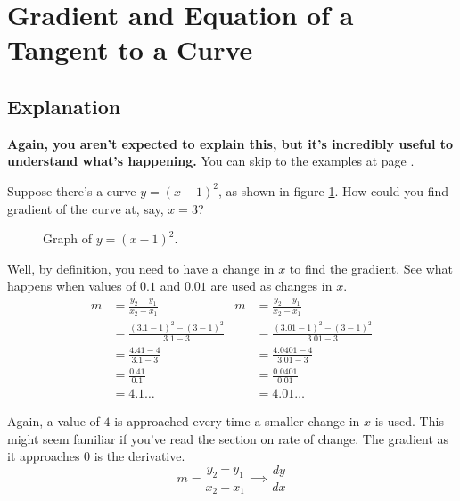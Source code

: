 \section{Gradient and Equation of a Tangent to a Curve}
\subsection{Explanation}
\textbf{Again, you aren't expected to explain this, but it's incredibly useful to understand what's happening.} You can skip to the examples at page \pageref{sec:derivativeExamples}.

Suppose there's a curve $y=(x-1)^2$, as shown in figure \ref{fig:gradientBasicExample}. How could you find gradient of the curve at, say, $x=3$?

\begin{figure}[h!]
	\centering
	\caption{Graph of $y=(x-1)^2$.}
	\label{fig:gradientBasicExample}
\end{figure}

Well, by definition, you need to have a change in $x$ to find the gradient. See what happens when values of $0.1$ and $0.01$ are used as changes in $x$.
\begin{align*}
	m &= \frac{y_2 - y_1}{x_2 - x_1} & m &= \frac{y_2 - y_1}{x_2 - x_1}\\
	&= \frac{(3.1-1)^2 - (3-1)^2}{3.1-3} & &= \frac{(3.01-1)^2 - (3-1)^2}{3.01-3}\\
	&= \frac{4.41 - 4}{3.1-3} & &= \frac{4.0401 - 4}{3.01-3}\\
	&= \frac{0.41}{0.1} & &= \frac{0.0401}{0.01}\\
	&= 4.1\dots & &= 4.01\dots
\end{align*}

Again, a value of $4$ is approached every time a smaller change in $x$ is used. This might seem familiar if you've read the section on rate of change. The gradient as it approaches $0$ is the derivative.
\begin{equation*}
	m = \frac{y_2 - y_1}{x_2 - x_1} \implies \frac{dy}{dx}
\end{equation*}

